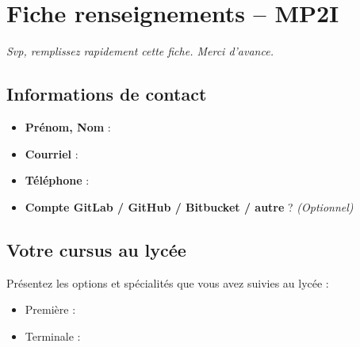 
\section*{Fiche renseignements -- MP2I}
\emph{Svp, remplissez rapidement cette fiche. Merci d'avance.}

\subsection*{Informations de contact}
\begin{itemize}
    \item \textbf{Prénom, Nom} :

    \item \textbf{Courriel} :

    \item \textbf{Téléphone} :


    \item \textbf{Compte GitLab / GitHub / Bitbucket / autre} ?
    \hfill{}
    \emph{(Optionnel)}

        \vspace*{20pt}
\end{itemize}

\subsection*{Votre cursus au lycée}
Présentez les options et spécialités que vous avez suivies au lycée :
\begin{itemize}
    \item Première :
    \item Terminale :
\end{itemize}




